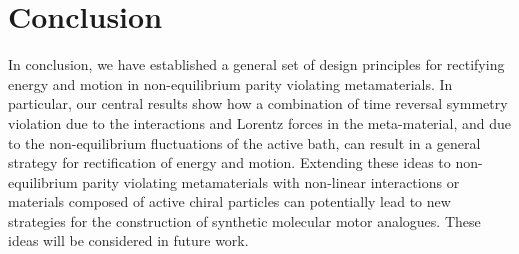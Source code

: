 \documentclass[
 preprint,
 preprintnumbers,
 amsmath,amssymb,
 aps,
 pre,
 longbibliography,
 superscriptaddress,
 10pt, twocolumn
]{revtex4-1}
\begin{document}


\section{Conclusion} \label{sec:conclusion}

In conclusion, we have established a general set of design principles for rectifying energy and motion in non-equilibrium parity violating metamaterials. In particular, our central results show how a combination of time reversal symmetry violation due to the interactions and Lorentz forces in the meta-material, and due to the non-equilibrium fluctuations of the active bath, can result in a general strategy for rectification of energy and motion. Extending these ideas to non-equilibrium parity violating metamaterials with non-linear interactions or materials composed of active chiral particles can potentially lead to new strategies for the construction of synthetic molecular motor analogues. These ideas will be considered in future work. 


\end{document}
